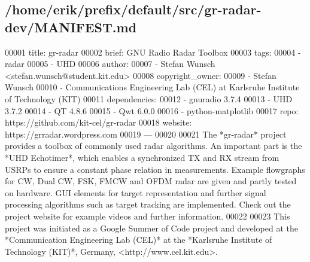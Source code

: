 \subsection{/home/erik/prefix/default/src/gr-\/radar-\/dev/\+M\+A\+N\+I\+F\+E\+ST.md}

\begin{DoxyCode}
00001 title: gr-radar
00002 brief: GNU Radio Radar Toolbox
00003 tags:
00004   - radar
00005   - UHD
00006 author:
00007   - Stefan Wunsch <stefan.wunsch@student.kit.edu>
00008 copyright\_owner:
00009   - Stefan Wunsch
00010   - Communications Engineering Lab (CEL) at Karlsruhe Institute of Technology (KIT)
00011 dependencies:
00012   - gnuradio 3.7.4
00013   - UHD 3.7.2
00014   - QT 4.8.6
00015   - Qwt 6.0.0
00016   - python-matplotlib
00017 repo: https://github.com/kit-cel/gr-radar
00018 website: https://grradar.wordpress.com
00019 ---
00020 
00021 The *gr-radar* project provides a toolbox of commonly used radar algorithms. An important part is the
       *UHD Echotimer*, which enables a synchronized TX and RX stream from USRPs to ensure a constant phase
       relation in measurements. Example flowgraphs for CW, Dual CW, FSK, FMCW and OFDM radar are given and partly tested
       on hardware. GUI elements for target representation and further signal processing algorithms such as target
       tracking are implemented. Check out the project website for example videos and further information.
00022 
00023 This project was initiated as a Google Summer of Code project and developed at the *Communication
       Engineering Lab (CEL)* at the *Karlsruhe Institute of Technology (KIT)*, Germany, <http://www.cel.kit.edu>.
\end{DoxyCode}
